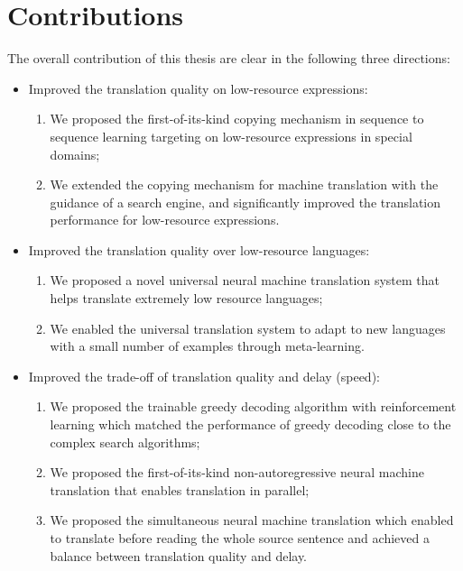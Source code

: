 \section{Contributions}
The overall contribution of this thesis are clear in the following three directions:
\begin{itemize}
	\item Improved the translation quality on low-resource expressions:
	\begin{enumerate}
		\item We proposed the first-of-its-kind copying mechanism in sequence to sequence learning targeting on low-resource expressions in special domains;
		\item We extended the copying mechanism for machine translation  with the guidance of a search engine, and significantly improved the translation performance for low-resource expressions.
	\end{enumerate}
	\item Improved the translation quality over low-resource languages:
	\begin{enumerate}
		\item We proposed a novel universal neural machine translation system that helps translate extremely low resource languages;
		\item We enabled the universal translation system to adapt to new languages with a small number of examples through meta-learning.
	\end{enumerate}
	\item Improved the trade-off of translation quality and delay (speed):
	\begin{enumerate}
		\item We proposed the trainable greedy decoding algorithm with reinforcement learning which matched the performance of greedy decoding close to the complex search algorithms;
		\item We proposed the first-of-its-kind non-autoregressive neural machine translation that enables translation in parallel;
		\item We proposed the simultaneous neural machine translation which enabled to translate before reading the whole source sentence and achieved a balance between translation quality and delay.
	\end{enumerate}
\end{itemize}

